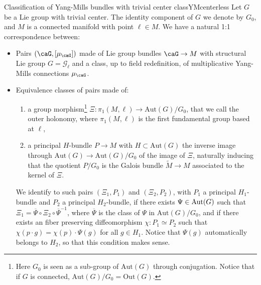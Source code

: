 \documentclass[reqno,a4paper,oneside]{amsart}
\newcommand\mutot{\mu_\caG}
\theoremstyle{plain}
\theoremstyle{remark}
\theoremstyle{definition}
\begin{document}
		\begin{propositions}{Classification of Yang-Mills bundles with trivial center}
		{classYMcenterless}
		Let $G$ be a Lie group with trivial center. The identity component of $G$ we denote by $G_0$, and $M$ is a connected manifold with point $\ell \in M$. We have a natural 1:1 correspondence between:

		\begin{itemize}
			\item Pairs $(\caG, [\mutot])$ made of Lie group bundles $\caG \to M$ with structural Lie group $G = \mathcal G_\ell$ and a class, up to field redefinition, of multiplicative Yang-Mills connections $\mutot$.
			\item Equivalence classes of pairs made of:
				\begin{enumerate}
				\item a group morphism\footnote{Here $G_0$ is seen as a sub-group of $ \mathrm{Aut}(G)$ through conjugation. Notice that if $G$ is connected, $ \mathrm{Aut}(G)/G_0= \mathrm{Out}(G)$.} $\Xi \colon \pi_1(M,\ell) \longrightarrow \mathrm{Aut}(G)/G_0$, that we call the outer holonomy, where $\pi_1(M,\ell)$ is the first fundamental group based at $\ell$,
				\item a principal $H$-bundle $P \to M $ with $H \subset {\mathrm{Aut}}(G)$ the inverse image through ${\mathrm{Aut}}(G) \to {\mathrm{Aut}}(G)/G_0$ of the image of $\Xi$, naturally inducing that the quotient $P/G_0$ is the Galois bundle $ \tilde M \to M$ associated to the kernel of $ \Xi$. 
				\end{enumerate}
				We identify to such pairs $(\Xi_1,P_1) $ and $ (\Xi_2,P_2)$, with $P_1$ a principal $ H_1$-bundle and $ P_2$ a principal $ H_2 $-bundle, if there exists $ \Psi \in {\rm Aut}(G)$ such that $ \Xi_1= \overline{\Psi}\circ \Xi_2 \circ \overline{\Psi}^{-1}$, where $\overline \Psi$ is the class of $\Psi$ in $\mathrm{Aut}(G)/G_0$, and if there exists an fiber preserving diffeomorphism $ \chi \colon P_1 \simeq P_2 $ such that $ \chi (p \cdot g) = \chi(p) \cdot \Psi(g)$ for all $g \in H_1$.
				Notice that $ \Psi(g)$ automatically belongs to $ H_2$, so that this condition makes sense.
				\end{itemize} 
		\end{propositions}
    
\end{document}
